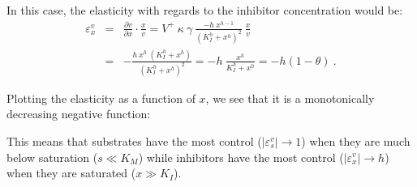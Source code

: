 \documentclass[12pt,a4paper]{article}
\begin{document}
In this case, the elasticity with regards to the inhibitor concentration would be:
\begin{eqnarray}
    \varepsilon_x^v &=& \frac{\partial v}{\partial x}\cdot\frac{x}{v} = V^+ ~ \kappa ~ \gamma ~ \frac{- h ~ x^{h-1}}{(K_I^h + x^h)^2} ~ \frac{x}{v} \nonumber \\
    &=& -\frac{h ~ x^h ~ (K_I^h + x^h)}{(K_I^h + x^h)^2} = -h ~ \frac{x^h}{K_I^h + x^h} = -h (1 - \theta)~. \label{eq:eps_inh}
\end{eqnarray}

Plotting the elasticity as a function of $x$, we see that it is a monotonically decreasing negative function:

\begin{center}
\end{center}

This means that substrates have the most control ($|\varepsilon_s^v| \rightarrow 1$) when they are much below saturation ($s \ll K_M$) while inhibitors have the most control ($|\varepsilon_x^v| \rightarrow h$) when they are saturated ($x \gg K_I$).
\end{document}
